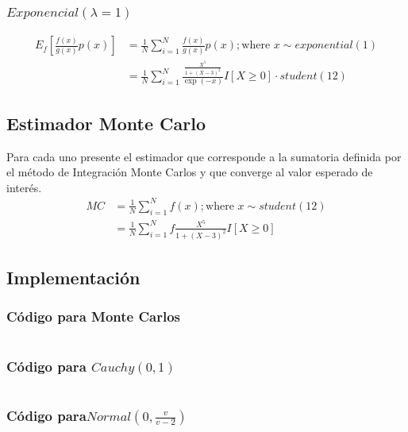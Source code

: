 \documentclass{article}
\begin{document}
\subsubsection{$Exponencial(\lambda=1)$}
\[
	\begin{split}
		E_f\left[\frac{f(x)}{g(x)}p(x)\right] & = \frac{1}{N}\sum_{i=1}^{N}\frac{f(x)}{g(x)}p(x) ; \text{where } x \sim exponential(1)           \\
		                                      & = \frac{1}{N}\sum_{i=1}^{N}\frac{\frac{X^5}{1+(X - 3)^2} }{\exp(-x)}I[X \ge 0] \cdot student(12)
	\end{split}
\]


\subsection{Estimador Monte Carlo}
Para cada uno presente el estimador que corresponde a la sumatoria definida por el método de Integración
Monte Carlos y que converge al valor esperado de interés.
\[
	\begin{split}
		MC & = \frac{1}{N}\sum_{i=1}^{N}f(x) ; \text{where } x \sim student(12) \\
		   & = \frac{1}{N}\sum_{i=1}^{N}f\frac{X^5}{1+(X - 3)^2}I[X \ge 0]
	\end{split}
\]


\subsection{Implementación}

\subsubsection{Código para Monte Carlos}
\begin{pythonbox}
	\inputminted{python}{code/mc.py}
\end{pythonbox}

\subsubsection{Código para $Cauchy(0,1)$}
\begin{pythonbox}
	\inputminted{python}{code/cauchy.py}
\end{pythonbox}

\subsubsection{Código para$Normal(0, \frac{v}{v-2})$}
\begin{pythonbox}
	\inputminted{python}{code/normal.py}
\end{pythonbox}
\end{document}
